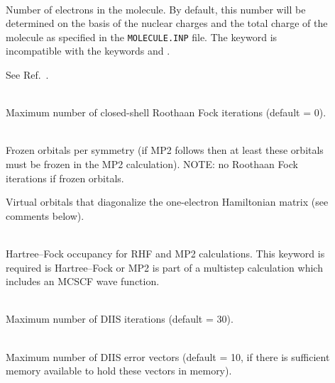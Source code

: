 \begin{description}
\item[]
   \\
  Number of electrons in the molecule. By
  default, this number will be
  determined on the basis of the nuclear charges and the total charge
  of the molecule as specified in the
  \verb|MOLECULE.INP| file. The
  keyword is incompatible with the keywords  and .

\item[]
  See Ref.~\cite{cwbjcp72}.

\item[]
   \\
  Maximum number of closed-shell Roothaan
  Fock iterations (default = 0).

\item[]
   \\
  Frozen orbitals per symmetry (if MP2 follows then at least these orbitals
  must be frozen in the MP2 calculation).
  NOTE: no Roothaan Fock iterations if frozen orbitals.

\item[]
  Virtual orbitals that diagonalize the one-electron Hamiltonian matrix
  (see comments below).

\item[]
     \\
  Hartree--Fock occupancy for RHF and MP2 calculations. This keyword
  is required is Hartree--Fock or MP2 is part of a multistep
  calculation which includes an MCSCF wave function. 

\item[]
   \\
  Maximum number of DIIS iterations (default = 30).

\item[]
   \\
  Maximum number of DIIS error vectors
  (default = 10, if there is sufficient memory available to hold these
  vectors in memory).


\end{description}
